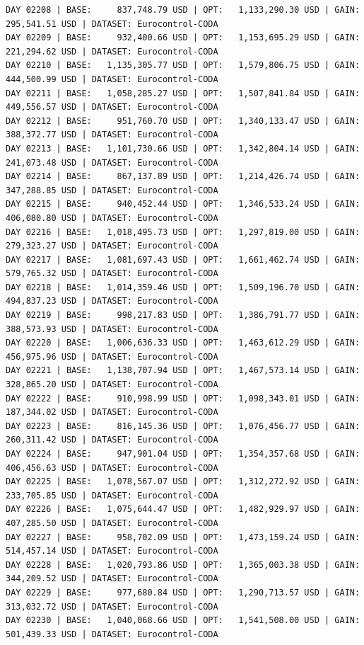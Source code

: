\documentclass[11pt,a4paper]{article}
\begin{document}
\begin{verbatim}
DAY 02208 | BASE:     837,748.79 USD | OPT:   1,133,290.30 USD | GAIN: 295,541.51 USD | DATASET: Eurocontrol-CODA
DAY 02209 | BASE:     932,400.66 USD | OPT:   1,153,695.29 USD | GAIN: 221,294.62 USD | DATASET: Eurocontrol-CODA
DAY 02210 | BASE:   1,135,305.77 USD | OPT:   1,579,806.75 USD | GAIN: 444,500.99 USD | DATASET: Eurocontrol-CODA
DAY 02211 | BASE:   1,058,285.27 USD | OPT:   1,507,841.84 USD | GAIN: 449,556.57 USD | DATASET: Eurocontrol-CODA
DAY 02212 | BASE:     951,760.70 USD | OPT:   1,340,133.47 USD | GAIN: 388,372.77 USD | DATASET: Eurocontrol-CODA
DAY 02213 | BASE:   1,101,730.66 USD | OPT:   1,342,804.14 USD | GAIN: 241,073.48 USD | DATASET: Eurocontrol-CODA
DAY 02214 | BASE:     867,137.89 USD | OPT:   1,214,426.74 USD | GAIN: 347,288.85 USD | DATASET: Eurocontrol-CODA
DAY 02215 | BASE:     940,452.44 USD | OPT:   1,346,533.24 USD | GAIN: 406,080.80 USD | DATASET: Eurocontrol-CODA
DAY 02216 | BASE:   1,018,495.73 USD | OPT:   1,297,819.00 USD | GAIN: 279,323.27 USD | DATASET: Eurocontrol-CODA
DAY 02217 | BASE:   1,081,697.43 USD | OPT:   1,661,462.74 USD | GAIN: 579,765.32 USD | DATASET: Eurocontrol-CODA
DAY 02218 | BASE:   1,014,359.46 USD | OPT:   1,509,196.70 USD | GAIN: 494,837.23 USD | DATASET: Eurocontrol-CODA
DAY 02219 | BASE:     998,217.83 USD | OPT:   1,386,791.77 USD | GAIN: 388,573.93 USD | DATASET: Eurocontrol-CODA
DAY 02220 | BASE:   1,006,636.33 USD | OPT:   1,463,612.29 USD | GAIN: 456,975.96 USD | DATASET: Eurocontrol-CODA
DAY 02221 | BASE:   1,138,707.94 USD | OPT:   1,467,573.14 USD | GAIN: 328,865.20 USD | DATASET: Eurocontrol-CODA
DAY 02222 | BASE:     910,998.99 USD | OPT:   1,098,343.01 USD | GAIN: 187,344.02 USD | DATASET: Eurocontrol-CODA
DAY 02223 | BASE:     816,145.36 USD | OPT:   1,076,456.77 USD | GAIN: 260,311.42 USD | DATASET: Eurocontrol-CODA
DAY 02224 | BASE:     947,901.04 USD | OPT:   1,354,357.68 USD | GAIN: 406,456.63 USD | DATASET: Eurocontrol-CODA
DAY 02225 | BASE:   1,078,567.07 USD | OPT:   1,312,272.92 USD | GAIN: 233,705.85 USD | DATASET: Eurocontrol-CODA
DAY 02226 | BASE:   1,075,644.47 USD | OPT:   1,482,929.97 USD | GAIN: 407,285.50 USD | DATASET: Eurocontrol-CODA
DAY 02227 | BASE:     958,702.09 USD | OPT:   1,473,159.24 USD | GAIN: 514,457.14 USD | DATASET: Eurocontrol-CODA
DAY 02228 | BASE:   1,020,793.86 USD | OPT:   1,365,003.38 USD | GAIN: 344,209.52 USD | DATASET: Eurocontrol-CODA
DAY 02229 | BASE:     977,680.84 USD | OPT:   1,290,713.57 USD | GAIN: 313,032.72 USD | DATASET: Eurocontrol-CODA
DAY 02230 | BASE:   1,040,068.66 USD | OPT:   1,541,508.00 USD | GAIN: 501,439.33 USD | DATASET: Eurocontrol-CODA

\end{verbatim}
\end{document}
